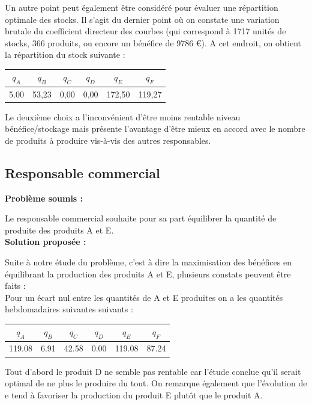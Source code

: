 \documentclass[paper=a4, fontsize=11pt]{scrartcl}
\numberwithin{equation}{section}		%
\numberwithin{figure}{section}			%
\numberwithin{table}{section}				%
\renewcommand{\bf}[1]{\textbf{#1}}
\begin{document}
Un autre point peut également être considéré pour évaluer une répartition optimale des stocks. Il s'agit du dernier point où on constate une variation brutale du coefficient directeur des courbes (qui correspond à 1717 unités de stocks, 366 produits, ou encore un bénéfice de 9786 €). A cet endroit, on obtient la répartition du stock suivante :

\begin{center}
\begin{tabular}{cccccc}
\hline 
$q_A$ & $q_B$ & $q_C$ & $q_D$ & $q_E$ & $q_F$ \\ 
\hline 
5.00 & 53,23 & 0,00 & 0,00 & 172,50 & 119,27 \\ 
\hline 
\end{tabular} 
\end{center}

Le deuxième choix a l'inconvénient d'être moins rentable niveau bénéfice/stockage mais présente l'avantage d'être mieux en accord avec le nombre de produits à produire vis-à-vis des autres responsables.

\subsection{Responsable commercial}
\bf{Problème soumis :}

Le responsable commercial souhaite pour sa part équilibrer la quantité de produite des produits A et E.\\

\bf{Solution proposée :}

Suite à notre étude du problème, c'est à dire la maximisation des bénéfices en équilibrant la production des produits A et E, plusieurs constats peuvent être faits :\\
Pour un écart nul entre les quantités de A et E produites on a les quantités hebdomadaires suivantes suivants :
\begin{center}
\begin{tabular}{cccccc}
\hline
$q_A$ & $q_B$ & $q_C$ & $q_D$ & $q_E$ & $q_F$ \\
\hline
119.08 & 6.91 & 42.58 & 0.00 & 119.08 & 87.24 \\
\hline
\end{tabular}
\end{center}
Tout d'abord le produit D ne semble pas rentable car l'étude conclue qu'il serait optimal de ne plus le produire du tout.
On remarque également que l’évolution de e tend à favoriser la production du produit E plutôt que le produit A.
\end{document}
